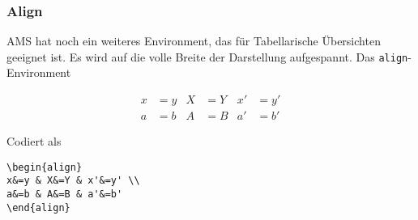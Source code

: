 \subsubsection{Align}

AMS hat noch ein weiteres Environment, das für Tabellarische Übersichten geeignet ist. Es wird auf die volle Breite der Darstellung aufgespannt. Das \texttt{align}-Environment

\begin{align}
x&=y & X&=Y & x'&=y' \\
a&=b & A&=B & a'&=b'
\end{align}

Codiert als 

\begin{verbatim}
\begin{align}
x&=y & X&=Y & x'&=y' \\
a&=b & A&=B & a'&=b'
\end{align}
\end{verbatim}

